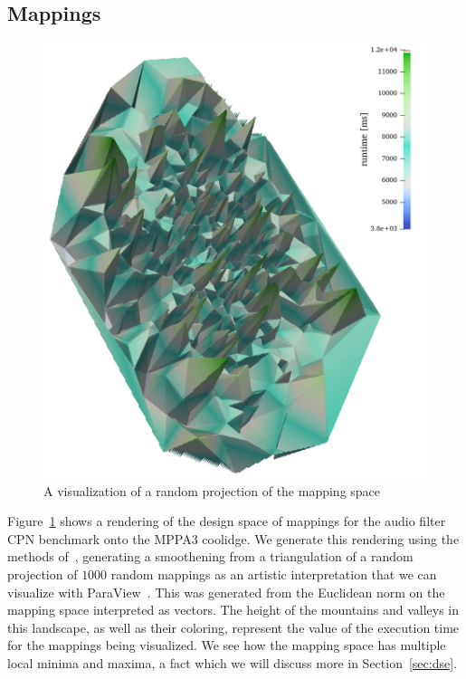 \subsection{Mappings}
\begin{figure}[h]
	\centering
\includegraphics[width=\textwidth]{figures/coolidge-af-space3.png}
	\caption{A visualization of a random projection of the mapping space}
	\label{fig:mapping_space_visualization}
\end{figure}

Figure~\ref{fig:mapping_space_visualization} shows a rendering of the design space of mappings for the audio filter \ac{CPN} benchmark onto the MPPA3 coolidge. 
We generate this rendering using the methods of~\cite{visualloss}, generating a smoothening from a triangulation of a random projection of $1000$ random mappings as an artistic interpretation that we can visualize with ParaView~\cite{paraview}.
This was generated from the Euclidean norm on the mapping space interpreted as vectors.
The height of the mountains and valleys in this landscape, as well as their coloring, represent the value of the execution time for the mappings being visualized.
We see how the mapping space has multiple local minima and maxima, a fact which we will discuss more in Section~\ref{sec:dse}. 

